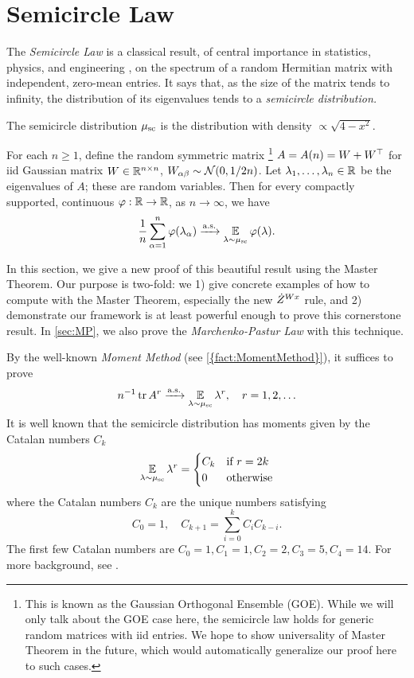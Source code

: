 \documentclass[main.tex]{subfiles}
\begin{document}
\section{Semicircle Law}
\label{sec:semicircle}

The \emph{Semicircle Law} \citep{wigner_characteristic_1955,wigner_distribution_1958} is a classical result, of central importance in statistics, physics, and engineering \citep{kivelson_global_1992,von_oppen_conductivity_2000,couillet_random_2011,mezzadri_recent_2005}, on the spectrum of a random Hermitian matrix with independent, zero-mean entries.
It says that, as the size of the matrix tends to infinity, the distribution of its eigenvalues tends to a \emph{semicircle distribution.}
\begin{defn}
    The semicircle distribution $\mu_{\mathrm{sc}}$ is the distribution with density $\propto \sqrt{4-x^2}$.
\end{defn}
\begin{thm}\label{thm:semicircleLawGOE}
    For each $n \ge 1$, define the random symmetric matrix%
    \footnote{This is known as the Gaussian Orthogonal Ensemble (GOE). While we will only talk about the GOE case here, the semicircle law holds for generic random matrices with iid entries.
    We hope to show universality of \netsort{} Master Theorem in the future, which would automatically generalize our proof here to such cases.}
    $ A = A(n) = W+W^{\top}$ for iid Gaussian matrix $W\in\mathbb{R}^{n\times n}$, $W_{\alpha\beta}\sim\mathcal{N}(0,1/{2n})$.
    Let $\lambda_1, \ldots, \lambda_n \in \mathbb{R}$ be the eigenvalues of $A$; these are random variables.
    Then for every compactly supported, continuous $\varphi: \mathbb{R} \to \mathbb{R}$, as $n\to\infty$, we have
    \[\frac{1}{n} \sum_{\alpha=1}^n \varphi(\lambda_\alpha) \xrightarrow{\mathrm{a.s.}} \operatorname*{\mathbb{E}}_{\lambda\sim \mu_{\mathrm{sc}}}\varphi(\lambda).\]
\end{thm}
In this section, we give a new proof of this beautiful result using the \netsort{} Master Theorem. Our purpose is two-fold: we 1) give concrete examples of how to compute with the Master Theorem, especially the new $\dot Z^{Wx}$ rule, and 2) demonstrate our framework is at least powerful enough to prove this cornerstone result.
In \cref{sec:MP}, we also prove the \emph{Marchenko-Pastur Law} with this technique.

By the well-known \emph{Moment Method} (see \cref{{fact:MomentMethod}}), it suffices to prove
\[{n}^{-1} \operatorname{tr} A^r \xrightarrow{\mathrm{a.s.}} \operatorname*{\mathbb{E}}_{\lambda \sim \mu_{\mathrm{sc}}} \lambda^r,\quad r=1,2,\ldots\]
It is well known that the semicircle distribution has moments given by the Catalan numbers $C_{k}$
\[
\operatorname*{\mathbb{E}}_{\lambda\sim\mu_{\mathrm{sc}}}\lambda^{r}=\begin{cases}
C_{k} & \text{if \ensuremath{r=2k}}\\
0 & \text{otherwise}
\end{cases}
\]
where the Catalan numbers $C_{k}$ are the unique numbers satisfying
\begin{equation}
C_{0}=1,\quad C_{k+1}=\sum_{i=0}^{k}C_{i}C_{k-i}.
\label{eqn:Catalan}
\end{equation}
The first few Catalan numbers are $C_{0}=1,C_{1}=1,C_{2}=2,C_{3}=5,C_{4}=14$. For more background, see \citet{tao_topics_2012}. 
\end{document}

